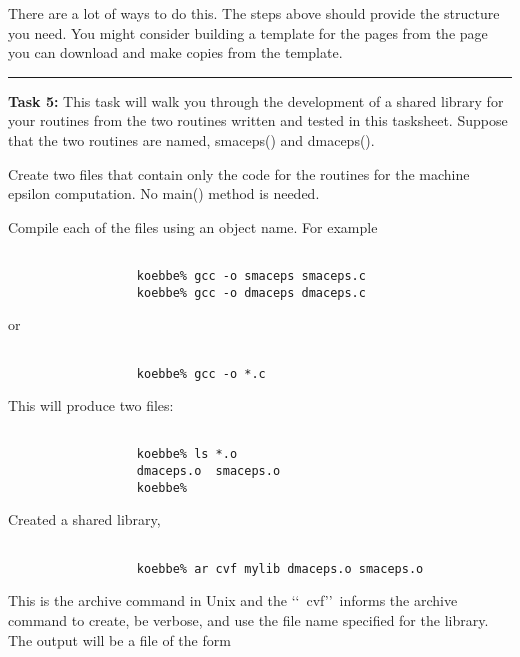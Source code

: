 \documentclass[10pt,fleqn]{article}
\begin{document}
\begin{trivlist}
\begin{trivlist}
\begin{verbatim}
                \end{verbatim}
                
        \end{trivlist}
        There are a lot of ways to do this. The steps above  should provide the
        structure you need. You might consider building a template for the pages
        from the page you can download and make copies from the template.
\vskip0.1in\hrule\vskip0.1in \noindent
  \item[\bf Task 5:] This task will walk you through the development of a shared
        library for your routines from the two routines written and tested in
        this tasksheet. Suppose that the two routines are named, smaceps() and
        dmaceps().
        \begin{trivlist}
          \item Create two files that contain only the code for the routines for
                the machine epsilon computation. No main() method is needed.
          \item Compile each of the files using an object name. For example
                \begin{verbatim}

                  koebbe% gcc -o smaceps smaceps.c
                  koebbe% gcc -o dmaceps dmaceps.c

                \end{verbatim}
                or
                \begin{verbatim}

                  koebbe% gcc -o *.c

                \end{verbatim}
                This will produce two files:
                \begin{verbatim}

                  koebbe% ls *.o
                  dmaceps.o  smaceps.o
                  koebbe%

                \end{verbatim}
          \item Created a shared library,
                \begin{verbatim}

                  koebbe% ar cvf mylib dmaceps.o smaceps.o

                \end{verbatim}
                This is the archive command in Unix and the \lq\lq\ cvf\rq\rq\
                informs the archive command to create, be verbose, and use the
                file name specified for the library. The output will be a file
                of the form
                \begin{verbatim}


\end{verbatim}
\end{trivlist}
\end{trivlist}
\end{document}
